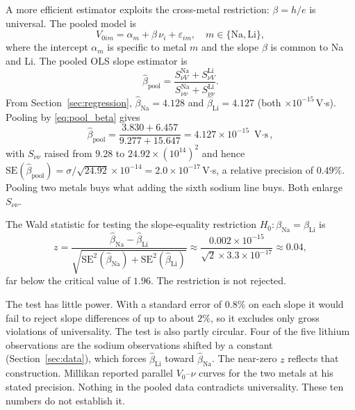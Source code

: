 \documentclass[12pt]{article}
\begin{document}
A more efficient estimator exploits the cross-metal restriction: $\beta = h/e$
is universal.  The pooled model is
\begin{equation}\label{eq:panel}
  V_{0im} = \alpha_m + \beta\,\nu_i + \varepsilon_{im},
  \quad m\in\{\mathrm{Na},\mathrm{Li}\},
\end{equation}
where the intercept $\alpha_m$ is specific to metal $m$ and the slope $\beta$
is common to Na and Li.  The pooled OLS slope estimator is
\begin{equation}\label{eq:pool_beta}
  \hat\beta_{\mathrm{pool}} =
  \frac{S_{\nu V}^{\mathrm{Na}} + S_{\nu V}^{\mathrm{Li}}}
       {S_{\nu\nu}^{\mathrm{Na}} + S_{\nu\nu}^{\mathrm{Li}}}.
\end{equation}
From Section~\ref{sec:regression}, $\hat\beta_{\mathrm{Na}} = 4.128$ and
$\hat\beta_{\mathrm{Li}} = 4.127$ (both $\times10^{-15}$\,V$\cdot$s).
Pooling by \eqref{eq:pool_beta} gives
\[
  \hat\beta_{\mathrm{pool}} =
  \frac{3.830 + 6.457}{9.277 + 15.647}
  = 4.127\times10^{-15}\text{ V$\cdot$s},
\]
with $S_{\nu\nu}$ raised from $9.28$ to $24.92\times(10^{14})^2$ and hence
$\mathrm{SE}(\hat\beta_{\mathrm{pool}}) = \sigma/\sqrt{24.92}\times10^{-14}
= 2.0\times10^{-17}$\,V$\cdot$s, a relative precision of $0.49\%$.  Pooling
two metals buys what adding the sixth sodium line buys.  Both enlarge
$S_{\nu\nu}$.

The Wald statistic for testing the slope-equality restriction
$H_0\colon\beta_{\mathrm{Na}} = \beta_{\mathrm{Li}}$ is
\[
  z = \frac{\hat\beta_{\mathrm{Na}} - \hat\beta_{\mathrm{Li}}}
      {\sqrt{\mathrm{SE}^2(\hat\beta_{\mathrm{Na}})
           + \mathrm{SE}^2(\hat\beta_{\mathrm{Li}})}}
  \approx \frac{0.002\times10^{-15}}
      {\sqrt{2}\times3.3\times10^{-17}}
  \approx 0.04,
\]
far below the critical value of $1.96$.  The restriction is not rejected.

The test has little power.  With a standard error of $0.8\%$ on each slope it
would fail to reject slope differences of up to about $2\%$, so it excludes
only gross violations of universality.  The test is also partly circular.
Four of the five lithium observations are the sodium observations shifted by a
constant (Section~\ref{sec:data}), which forces $\hat\beta_{\mathrm{Li}}$
toward $\hat\beta_{\mathrm{Na}}$.  The near-zero $z$ reflects that
construction.  Millikan reported parallel $V_0$--$\nu$ curves for the two
metals at his stated precision.  Nothing in the pooled data contradicts
universality.  These ten numbers do not establish it.

\end{document}
